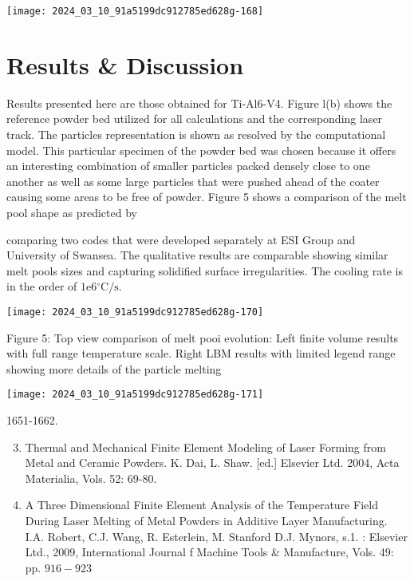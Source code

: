\documentclass[10pt]{article}
\begin{document}
\begin{center}
\texttt{[image: 2024\_03\_10\_91a5199dc912785ed628g-168]}
\end{center}

\section*{Results \& Discussion}
Results presented here are those obtained for Ti-Al6-V4. Figure l(b) shows the reference powder bed utilized for all calculations and the corresponding laser track. The particles representation is shown as resolved by the computational model. This particular specimen of the powder bed was chosen because it offers an interesting combination of smaller particles packed densely close to one another as well as some large particles that were pushed ahead of the coater causing some areas to be free of powder. Figure 5 shows a comparison of the melt pool shape as predicted by

comparing two codes that were developed separately at ESI Group and University of Swansea. The qualitative results are comparable showing similar melt pools sizes and capturing solidified surface irregularities. The cooling rate is in the order of $1 \mathrm{e} 6{ }^{\circ} \mathrm{C} / \mathrm{s}$.

\begin{center}
\texttt{[image: 2024\_03\_10\_91a5199dc912785ed628g-170]}
\end{center}

Figure 5: Top view comparison of melt pooi evolution: Left finite volume results with full range temperature scale. Right LBM results with limited legend range showing more details of the particle melting

\begin{center}
\texttt{[image: 2024\_03\_10\_91a5199dc912785ed628g-171]}
\end{center}

1651-1662.

\begin{enumerate}
  \setcounter{enumi}{2}
  \item Thermal and Mechanical Finite Element Modeling of Laser Forming from Metal and Ceramic Powders. K. Dai, L. Shaw. [ed.] Elsevier Ltd. 2004, Acta Materialia, Vols. 52: 69-80.

  \item A Three Dimensional Finite Element Analysis of the Temperature Field During Laser Melting of Metal Powders in Additive Layer Manufacturing. I.A. Robert, C.J. Wang, R. Esterlein, M. Stanford D.J. Mynors, s.1. : Elsevier Ltd., 2009, International Journal f Machine Tools \& Manufacture, Vols. 49: pp. $916-923$

\end{enumerate}
\end{document}
